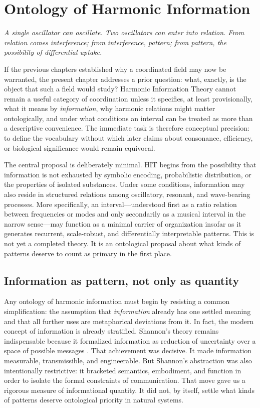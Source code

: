 \chapter{Ontology of Harmonic Information}

\epigraph{\emph{A single oscillator can oscillate. Two oscillators can enter into relation. From relation comes interference; from interference, pattern; from pattern, the possibility of differential uptake.}}{}


If the previous chapters established why a coordinated field may now be warranted, the present chapter addresses a prior question: what, exactly, is the object that such a field would study? Harmonic Information Theory cannot remain a useful category of coordination unless it specifies, at least provisionally, what it means by \emph{information}, why harmonic relations might matter ontologically, and under what conditions an interval can be treated as more than a descriptive convenience. The immediate task is therefore conceptual precision: to define the vocabulary without which later claims about consonance, efficiency, or biological significance would remain equivocal.

The central proposal is deliberately minimal. HIT begins from the possibility that information is not exhausted by symbolic encoding, probabilistic distribution, or the properties of isolated substances. Under some conditions, information may also reside in structured relations among oscillatory, resonant, and wave-bearing processes. More specifically, an interval---understood first as a ratio relation between frequencies or modes and only secondarily as a musical interval in the narrow sense---may function as a minimal carrier of organization insofar as it generates recurrent, scale-robust, and differentially interpretable patterns. This is not yet a completed theory. It is an ontological proposal about what kinds of patterns deserve to count as primary in the first place.


\section{Information as pattern, not only as quantity}


Any ontology of harmonic information must begin by resisting a common simplification: the assumption that \emph{information} already has one settled meaning and that all further uses are metaphorical deviations from it. In fact, the modern concept of information is already stratified. Shannon's theory remains indispensable because it formalized information as reduction of uncertainty over a space of possible messages \parencite{shannon_1948}. That achievement was decisive. It made information measurable, transmissible, and engineerable. But Shannon's abstraction was also intentionally restrictive: it bracketed semantics, embodiment, and function in order to isolate the formal constraints of communication. That move gave us a rigorous measure of informational quantity. It did not, by itself, settle what kinds of patterns deserve ontological priority in natural systems.

